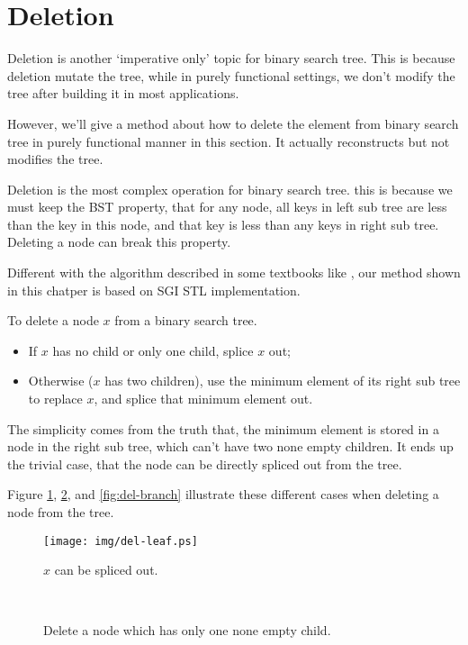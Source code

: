 \documentclass{article}
\begin{document}
\section{Deletion}
Deletion is another `imperative only' topic for binary search tree.
This is because deletion mutate the tree, while in purely functional
settings, we don't modify the tree after building it in most
applications.

However, we'll give a method about how to delete the element from
binary search tree in purely functional manner in this section.
It actually reconstructs but not modifies the tree.

Deletion is the most complex operation for binary search tree.
this is because we must keep the BST property, that for any node,
all keys in left sub tree are less than the key in this node, and
that key is less than any keys in right sub tree. Deleting a node
can break this property.

Different with the algorithm described in some textbooks like \cite{CLRS},
our method shown in this chatper is based on SGI STL implementation.\cite{sgi-stl}

To delete a node $x$ from a binary search tree.
\begin{itemize}
\item If $x$ has no child or only one child, splice $x$ out;
\item Otherwise ($x$ has two children), use the minimum element of its right sub tree to replace $x$, and splice that minimum element out.
\end{itemize}

The simplicity comes from the truth that, the minimum element is stored
in a node in the right sub tree, which can't have two none empty children.
It ends up the trivial case, that the node can be directly spliced
out from the tree.

Figure \ref{fig:del-leaf}, \ref{fig:del-1child}, and \ref{fig:del-branch}
illustrate these different cases when deleting a node from the tree.

\begin{figure}[htbp]
  \centering
  \texttt{[image: img/del-leaf.ps]}
  \caption{$x$ can be spliced out.} \label{fig:del-leaf}
\end{figure}

\begin{figure}[htbp]
  \centering
   \\
  \caption{Delete a node which has only one none empty child.}
  \label{fig:del-1child}
\end{figure}
\end{document}
